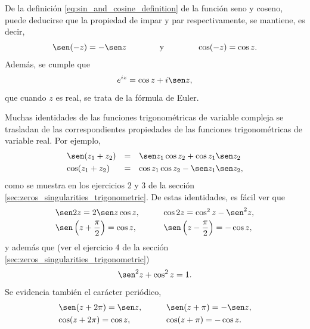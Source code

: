 \documentclass[a4paper]{report}
\begin{document}
De la definición \ref{eq:sin_and_cosine_definition} de la función seno y coseno, puede deducirse que la propiedad de impar y par respectivamente, se mantiene, es decir,
\begin{equation}\label{eq:sin_and_cosine_odd_even}
 \sen(-z)=-\sen z
 \qquad\qquad\textrm{y}\qquad\qquad 
 \cos(-z)=\cos z. 
\end{equation}
Además, se cumple que 
\begin{equation}\label{eq:euler_formula}
 e^{iz}=\cos z+i\sen z, 
\end{equation}
que cuando \(z\) es real, se trata de la fórmula de Euler.

Muchas identidades de las funciones trigonométricas de variable compleja se trasladan de las correspondientes propiedades de las funciones trigonométricas de variable real. Por ejemplo,
\begin{equation}\label{eq:sin_and_cosine_sum_arguments}
 \begin{array}{lll}
  \sen(z_1+z_2)&=&\sen z_1\cos z_2+\cos z_1\sen z_2\\[\smallskipamount]
  \cos(z_1+z_2)&=&\cos z_1\cos z_2-\sen z_1\sen z_2,
 \end{array} 
\end{equation}
como se muestra en los ejercicios 2 y 3 de la sección \ref{sec:zeros_singularities_trigonometric}. De estas identidades, es fácil ver que 
\[
 \begin{array}{ll}
  \sen2z=2\sen z\cos z, &\qquad\cos2z=\cos^2z-\sen^2 z,\\[\smallskipamount]
  \sen\left(z+\dfrac{\pi}{2}\right)=\cos z, &\qquad \sen\left(z-\dfrac{\pi}{2}\right)=-\cos z, 
 \end{array}
\]
y además que (ver el ejercicio 4 de la sección \ref{sec:zeros_singularities_trigonometric})
\begin{equation}\label{eq:sin_and_cosine_square_sum}
 \sen^2z+\cos^2z=1. 
\end{equation}
Se evidencia también el carácter periódico,  
\begin{equation}\label{eq:sin_and_cosine_periodicity}
 \begin{array}{ll}
  \sen(z+2\pi)=\sen z, &\qquad\sen(z+\pi)=-\sen z,\\[\smallskipamount]
  \cos(z+2\pi)=\cos z, &\qquad\cos(z+\pi)=-\cos z. 
 \end{array} 
\end{equation}
\end{document}
